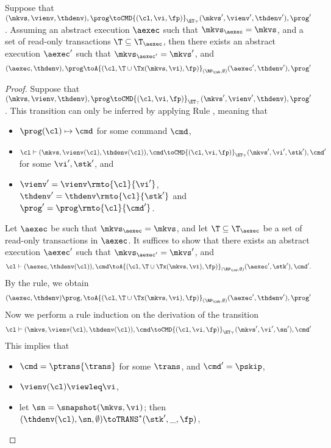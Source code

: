 \begin{proposition}
\label{prop:kv2aexec_transition}
Suppose that $(\mkvs, \vienv, \thdenv), \prog \toCMD{(\cl, \vi, \fp)}_{\ET_{\top}} (\mkvs', 
\vienv', \thdenv'), \prog'$. Assuming an abstract execution $\aexec$ 
such that $\mkvs_{\aexec} = \mkvs$, and a set of read-only transactions $\T \subseteq \T_{\aexec}$,
then there exists an abstract execution $\aexec'$ such that $\mkvs_{\aexec'} = \mkvs'$, and 
\[
(\aexec, \thdenv), \prog \toA{(\cl, \T \cup \Tx(\mkvs, \vi), \fp)}_{(\RP_{\LWW}, \emptyset)}
(\aexec', \thdenv'), \prog'
\]
\end{proposition}
\begin{proof}
Suppose that $(\mkvs, \vienv, \thdenv), \prog \toCMD{(\cl, \vi, \fp)}_{\ET_{\top}} (\mkvs', \vienv', \thdenv), \prog'$. 
This transition can only be inferred by applying Rule , meaning that 
\begin{itemize}
\item $\prog(\cl) \mapsto \cmd$ for some command $\cmd$, 
\item $\cl \vdash (\mkvs, \vienv(\cl), \thdenv(\cl)), \cmd \toCMD{(\cl, \vi, \fp)}_{\ET_{\top}} (\mkvs', \vi', \stk'), \cmd'$ 
for some $\vi', \stk'$, and 
\item $\vienv' = \vienv\rmto{\cl}{\vi'}$, $\thdenv' = \thdenv\rmto{\cl}{\stk'}$ and $\prog' = \prog\rmto{\cl}{\cmd'}$. 
\end{itemize}
Let $\aexec$ be such that $\mkvs_{\aexec} = \mkvs$, and let $\T \subseteq \T_{\aexec}$ be a set of read-only transactions in $\aexec$. 
It suffices to show that there exists an abstract execution $\aexec'$ such that 
$\mkvs_{\aexec'} = \mkvs'$, and 
\[
    \cl \vdash (\aexec, \thdenv(\cl)), \cmd \toA{(\cl, \T \cup \Tx(\mkvs, \vi), \fp)}_{(\RP_{\LWW}, \emptyset)} (\aexec', \stk'), \cmd'.
\]
By the  rule, we obtain 
\[ 
    (\aexec, \thdenv) \prog, \toA{(\cl, \T \cup \Tx(\mkvs,\vi), \fp)}_{(\RP_{\LWW}, \emptyset)} (\aexec' ,\thdenv'), \prog'
\]
Now we perform a rule induction on the derivation of the transition 
\[
    \cl \vdash (\mkvs, \vienv(\cl), \thdenv(\cl)), \cmd \toCMD{(\cl, \vi, \fp)}_{\ET_{\top}} (\mkvs', \vi', \sn'), \cmd'
\]
This implies that 
\begin{itemize}
\item $\cmd = \ptrans{\trans}$ for some $\trans$, and $\cmd' = \pskip$,
\item $\vienv(\cl) \viewleq \vi$, 
\item let $\sn = \snapshot(\mkvs, \vi)$; then $(\thdenv(\cl), \sn, \emptyset) \toTRANS^{\ast} (\stk', \_, \fp)$, 

\end{itemize}
\end{proof}
